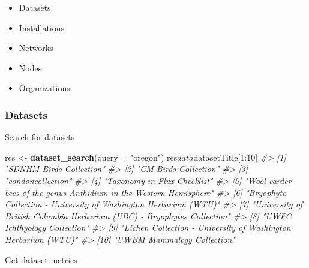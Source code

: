 \documentclass[author-year, review, 11pt]{components/elsarticle} %
\newenvironment{Shaded}{\begin{snugshade}}{\end{snugshade}}
\newcommand{\KeywordTok}[1]{\textcolor[rgb]{0.13,0.29,0.53}{\textbf{{#1}}}}
\newcommand{\DataTypeTok}[1]{\textcolor[rgb]{0.13,0.29,0.53}{{#1}}}
\newcommand{\DecValTok}[1]{\textcolor[rgb]{0.00,0.00,0.81}{{#1}}}
\newcommand{\StringTok}[1]{\textcolor[rgb]{0.31,0.60,0.02}{{#1}}}
\newcommand{\CommentTok}[1]{\textcolor[rgb]{0.56,0.35,0.01}{\textit{{#1}}}}
\newcommand{\NormalTok}[1]{{#1}}
\begin{document}
\begin{itemize}
\itemsep1pt\parskip0pt
\item
  Datasets
\item
  Installations
\item
  Networks
\item
  Nodes
\item
  Organizations
\end{itemize}

\subsubsection{Datasets}\label{datasets}

Search for datasets

\begin{Shaded}
\begin{Highlighting}[]
\NormalTok{res <-}\StringTok{ }\KeywordTok{dataset_search}\NormalTok{(}\DataTypeTok{query =} \StringTok{"oregon"}\NormalTok{)}
\NormalTok{res$data$datasetTitle[}\DecValTok{1}\NormalTok{:}\DecValTok{10}\NormalTok{]}
\CommentTok{#>  [1] "SDNHM Birds Collection"                                                }
\CommentTok{#>  [2] "CM Birds Collection"                                                   }
\CommentTok{#>  [3] "condoncollection"                                                      }
\CommentTok{#>  [4] "Taxonomy in Flux Checklist"                                            }
\CommentTok{#>  [5] "Wool carder bees of the genus Anthidium in the Western Hemisphere"     }
\CommentTok{#>  [6] "Bryophyte Collection - University of Washington Herbarium (WTU)"       }
\CommentTok{#>  [7] "University of British Columbia Herbarium (UBC) - Bryophytes Collection"}
\CommentTok{#>  [8] "UWFC Ichthyology Collection"                                           }
\CommentTok{#>  [9] "Lichen Collection - University of Washington Herbarium (WTU)"          }
\CommentTok{#> [10] "UWBM Mammalogy Collection"}
\end{Highlighting}
\end{Shaded}

Get dataset metrics

\begin{Shaded}
\end{Shaded}
\end{document}
